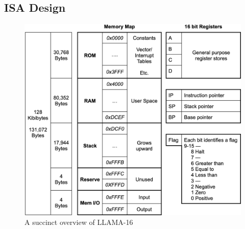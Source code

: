 \documentclass[man,hidelinks,floatsintext]{apa7}
\begin{document}
\subsection{ISA Design}
\begin{figure}[h]
  \centering
  \captionsetup{justification=centering}
  \includegraphics[width=.75\textwidth]{overview}
  \vspace*{3mm}
  \caption{A succinct overview of LLAMA-16}
  \label{fig:overview}
\end{figure}
\end{document}

